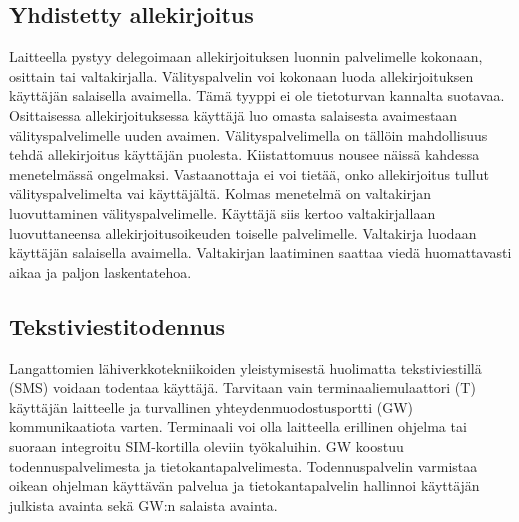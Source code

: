 \documentclass[finnish]{tktltiki2}
\theoremstyle{definition}
\theoremstyle{remark}
\begin{document}
\subsection{Yhdistetty allekirjoitus}

Laitteella pystyy delegoimaan allekirjoituksen luonnin palvelimelle kokonaan, osittain tai valtakirjalla. Välityspalvelin voi kokonaan luoda allekirjoituksen käyttäjän salaisella avaimella. Tämä tyyppi ei ole tietoturvan kannalta suotavaa. Osittaisessa allekirjoituksessa käyttäjä luo omasta salaisesta avaimestaan välityspalvelimelle uuden avaimen. Välityspalvelimella on tällöin mahdollisuus tehdä allekirjoitus käyttäjän puolesta. Kiistattomuus nousee näissä kahdessa menetelmässä ongelmaksi. Vastaanottaja ei voi tietää, onko allekirjoitus tullut välityspalvelimelta vai käyttäjältä. Kolmas menetelmä on valtakirjan luovuttaminen välityspalvelimelle. Käyttäjä siis kertoo valtakirjallaan luovuttaneensa allekirjoitusoikeuden toiselle palvelimelle. Valtakirja luodaan käyttäjän salaisella avaimella. Valtakirjan laatiminen saattaa viedä huomattavasti aikaa ja paljon laskentatehoa. \cite{joint}

\subsection{Tekstiviestitodennus}

Langattomien lähiverkkotekniikoiden yleistymisestä huolimatta tekstiviestillä (SMS) voidaan todentaa käyttäjä. Tarvitaan vain terminaaliemulaattori (T) käyttäjän laitteelle ja turvallinen yhteydenmuodostusportti (GW) kommunikaatiota varten. Terminaali voi olla laitteella erillinen ohjelma tai suoraan integroitu SIM-kortilla oleviin työkaluihin. GW koostuu todennuspalvelimesta ja tietokantapalvelimesta. Todennuspalvelin varmistaa oikean ohjelman käyttävän palvelua ja tietokantapalvelin hallinnoi käyttäjän julkista avainta sekä GW:n salaista avainta.
\end{document}
